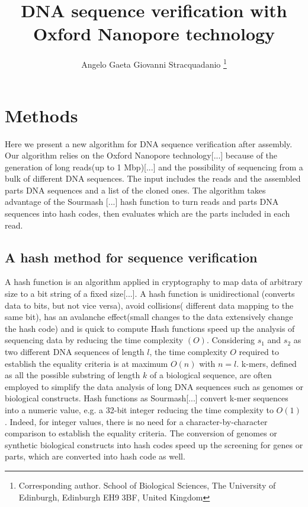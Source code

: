 \documentclass[11pt, a4paper]{article}
\begin{document}
\title{DNA sequence verification with Oxford Nanopore technology}
\author{Angelo Gaeta
        Giovanni Stracquadanio
        \thanks{Corresponding author. School of Biological Sciences,
        The University of Edinburgh, Edinburgh EH9 3BF, United Kingdom}}

\maketitle


\section{Methods}
Here we present a new algorithm for DNA sequence verification after assembly. Our algorithm relies on the Oxford Nanopore technology[...] 
because of the generation of long reads(up to 1 Mbp)[...] and the possibility of sequencing from a bulk of different DNA sequences. 
The input includes the reads and the assembled parts DNA sequences and a list of the cloned ones. 
The algorithm takes advantage of the Sourmash [...] hash function to turn reads and parts DNA sequences into hash codes, then evaluates which are the parts included in each read.

\subsection{A hash method for sequence verification}
A hash function is an algorithm applied in cryptography to map data of arbitrary size to a bit string of a fixed size[...]. 
A hash function is unidirectional (converts data to bits, but not vice versa), avoid collisions( different data mapping to the same bit), has an avalanche effect(small changes to the data extensively change the hash code) and is quick to compute
Hash functions speed up the analysis of sequencing data by reducing the time complexity $(O)$. 
Considering $s_1$ and $s_2$ as two different DNA sequences of length $l$, the time complexity $O$ required to establish the equality criteria is
at maximum $O(n)$ with $n=l$. 
k-mers, defined as all the possible substring of length $k$ of a biological sequence, are often employed to simplify the data analysis of 
long DNA sequences such as genomes or biological constructs.
Hash functions as Sourmash[...] convert k-mer sequences into a numeric value, e.g. a 32-bit integer reducing the time complexity to $O(1)$. Indeed, for integer values, 
there is no need for a character-by-character comparison to establish the equality criteria. 
The conversion of genomes or synthetic biological constructs into hash codes speed up the screening for genes or parts, which are converted into hash code as well. 
\end{document}
